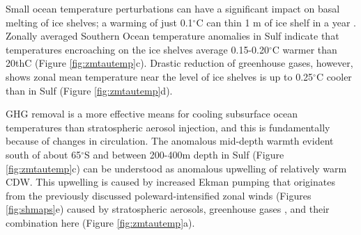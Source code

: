 \documentclass{nature}
\begin{document}
Small ocean temperature perturbations can have a significant impact on basal melting of ice shelves; a warming of just 0.1$^\circ$C can thin 1 m of ice shelf in a year \cite{rignot02}. Zonally averaged Southern Ocean temperature anomalies in Sulf indicate that temperatures encroaching on the ice shelves average 0.15-0.20$^\circ$C warmer than 20thC (Figure \ref{fig:zmtautemp}c). Drastic reduction of greenhouse gases, however, shows zonal mean temperature near the level of ice shelves is up to 0.25$^\circ$C cooler than in Sulf (Figure \ref{fig:zmtautemp}d). %

GHG removal is a more effective means for cooling subsurface ocean temperatures than stratospheric aerosol injection, and this is fundamentally because of changes in circulation. The anomalous mid-depth warmth evident south of about 65$^\circ$S and between 200-400m depth in Sulf (Figure \ref{fig:zmtautemp}c) can be understood as anomalous upwelling of relatively warm CDW. This upwelling is caused by increased Ekman pumping that originates from the previously discussed poleward-intensified zonal winds (Figures \ref{fig:shmaps}e) caused by stratospheric aerosols, greenhouse gases \cite{fyfe07}, and their combination here (Figure \ref{fig:zmtautemp}a). %
\end{document}
